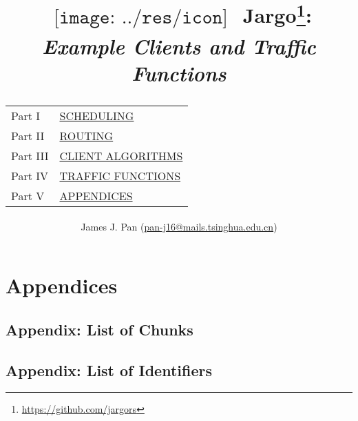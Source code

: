 \documentclass{report}
\title{
  $
  \begin{array}{l}
  \texttt{[image: ../res/icon]}
  \end{array}
  $
  Jargo\footnote{\url{https://github.com/jargors}}:\\
  \large{\textbf{\textit{Example Clients and Traffic Functions}}}\\
  \vspace{2em}
  {
    \small
    \begin{tabular}{lp{.6\textwidth}}
    \toprule
    Part I  &\hyperref[part-scheduling]{\textsc{SCHEDULING}}\\
    Part II  &\hyperref[part-routing]{\textsc{ROUTING}}\\
    Part III  &\hyperref[part-client]{\textsc{CLIENT ALGORITHMS}}\\
    Part IV &\hyperref[part-traffic]{\textsc{TRAFFIC FUNCTIONS}}\\
    Part V  &\hyperref[part-appendices]{\textsc{APPENDICES}}\\
    \bottomrule
    \end{tabular}
  }
}
\author{
  \small{James J. Pan (\href{mailto:pan-j16@mails.tsinghua.edu.cn}{pan-j16@mails.tsinghua.edu.cn})}
}
\theoremstyle{definition}                   %
\begin{document}
\maketitle
\pagestyle{noweb}

\renewcommand{\thepage}{\roman{page}}
\setcounter{page}{1}

\tableofcontents



\part{Appendices}
\label{part-appendices}

\appendix

\chapter{Appendix: List of Chunks}
\nowebchunks

\chapter{Appendix: List of Identifiers}
\nowebindex
\end{document}
